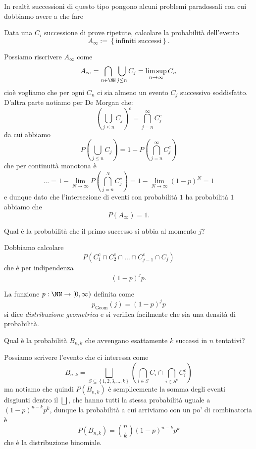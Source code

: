 \documentclass[11pt]{scrartcl}
\begin{document}
	In realtà successioni di questo tipo pongono alcuni problemi paradossali con cui dobbiamo avere a che fare
	\begin{example}
		Data una $C_i$ successione di prove ripetute, calcolare la probabilità dell'evento
		$$A_\infty:=\left\{\text{infiniti successi}\right\}.$$
	\end{example}
	\begin{answer}
		Possiamo riscrivere $A_\infty$ come
		$$A_\infty = \bigcap_{n\in\NN}\bigcup_{j\le n}C_j=\limsup_{n\to\infty} C_n$$
		cioè vogliamo che per ogni $C_n$ ci sia almeno un evento $C_j$ successivo soddisfatto. D'altra parte notiamo per De Morgan che:
		$$\left(\bigcup_{j\le n}C_j\right)^c=\bigcap_{j=n}^\infty C_j^c$$
		da cui abbiamo 
		$$P\left(\bigcup_{j\le n}C_j\right)=1-P\left(\bigcap_{j=n}^\infty C_j^c\right)$$
		che per continuità monotona è
		$$\dots=1-\lim_{N\to\infty}P\left(\bigcap_{j=n}^N C_j^c\right)=1-\lim_{N\to\infty}(1-p)^N=1$$
		e dunque dato che l'intersezione di eventi con probabilità $1$ ha probabilità $1$ abbiamo che 
		$$P(A_\infty)=1.$$
	\end{answer}
	\begin{example}
		Qual è la probabilità che il primo successo si abbia al momento $j$? 
	\end{example}
	\begin{answer}
		Dobbiamo calcolare
		$$P(C_1^c\cap C_2^c\cap \dots \cap C_{j-1}^c \cap C_j )$$
		che è per indipendenza
		$$(1-p)^jp.$$
	\end{answer}
	\begin{definition}
		La funzione $p:\NN\to [0,\infty)$ definita come
		$$p_\text{Geom}(j)=(1-p)^j p$$
		si dice \textit{distribuzione geometrica} e si verifica facilmente che sia una densità di probabilità.
	\end{definition}
	\begin{example}
		Qual è la probabilità $B_{n,k}$ che avvengano esattamente $k$ successi in $n$ tentativi? 
	\end{example}
	\begin{answer}
		Possiamo scrivere l'evento che ci interessa come
		$$B_{n,k}=\bigsqcup_{S\subseteq\left\{1,2,3,\dots,k\right\}}\left(\bigcap_{i\in S} C_i\cap \bigcap_{i\in S^c}C_i^c\right)$$
		ma notiamo che quindi $P(B_{n,k})$ è semplicemente la somma degli eventi disgiunti dentro il $\bigsqcup$, che hanno tutti la stessa probabilità uguale a $(1-p)^{n-k}p^k$, dunque la probabilità a cui arriviamo con un po' di combinatoria è
		$$P(B_{n,k})=\binom{n}{k}(1-p)^{n-k}p^k$$
		che è la distribuzione binomiale.
	\end{answer}
\end{document}
